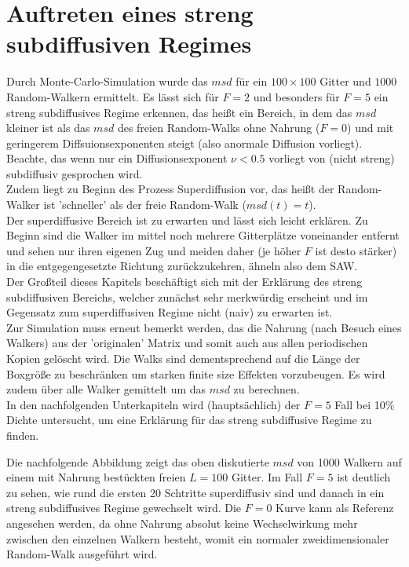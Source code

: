 \documentclass[a4paper, 12pt]{report}
\begin{document}
\section{Auftreten eines streng subdiffusiven Regimes}
Durch Monte-Carlo-Simulation wurde das $msd$ für ein $100 \times 100$ Gitter und $1000$ Random-Walkern ermittelt. Es lässt sich für $F=2$ und besonders für $F=5$ ein streng subdiffusives Regime erkennen, das heißt ein Bereich, in dem das $msd$ kleiner ist als das $msd$ des freien Random-Walks ohne Nahrung ($F=0$) und mit geringerem Diffsuionsexponenten steigt (also anormale Diffusion vorliegt). Beachte, das wenn nur ein Diffusionsexponent $\nu < 0.5$ vorliegt von (nicht streng) subdiffusiv gesprochen wird.\\
\noindent Zudem liegt zu Beginn des Prozess Superdiffusion vor, das heißt der Random-Walker ist 'schneller' als der freie Random-Walk ($msd(t)=t$).\\
\noindent Der superdiffusive Bereich ist zu erwarten und lässt sich leicht erklären. Zu Beginn sind die Walker im mittel noch mehrere Gitterplätze voneinander entfernt und sehen nur ihren eigenen Zug und meiden daher (je höher $F$ ist desto stärker) in die entgegengesetzte Richtung zurückzukehren, ähneln also dem SAW. \\
\noindent Der Großteil dieses Kapitels beschäftigt sich mit der Erklärung des streng subdiffusiven Bereichs, welcher zunächst sehr merkwürdig erscheint und im Gegensatz zum superdiffusiven Regime nicht (naiv) zu erwarten ist.
\\
\noindent Zur Simulation muss erneut bemerkt werden, das die Nahrung (nach Besuch eines Walkers) aus der 'originalen' Matrix und somit auch aus allen periodischen Kopien gelöscht wird. Die Walks sind dementsprechend auf die Länge der Boxgröße zu beschränken um starken finite size Effekten vorzubeugen. Es wird zudem über alle Walker gemittelt um das $msd$ zu berechnen.
\\
\noindent In den nachfolgenden Unterkapiteln wird (hauptsächlich) der $F=5$ Fall bei 10\% Dichte untersucht, um eine Erklärung für das streng subdiffusive Regime zu finden. 

\noindent Die nachfolgende Abbildung zeigt das oben diskutierte $msd$ von 1000 Walkern auf einem mit Nahrung bestückten freien $L=100$ Gitter. Im Fall $F=5$ ist deutlich zu sehen, wie rund die ersten 20 Schtritte superdiffusiv sind und danach in ein streng subdiffusives Regime gewechselt wird. Die $F=0$ Kurve kann als Referenz angesehen werden, da ohne Nahrung absolut keine Wechselwirkung mehr zwischen den einzelnen Walkern besteht, womit ein normaler zweidimensionaler Random-Walk ausgeführt wird.
\end{document}
